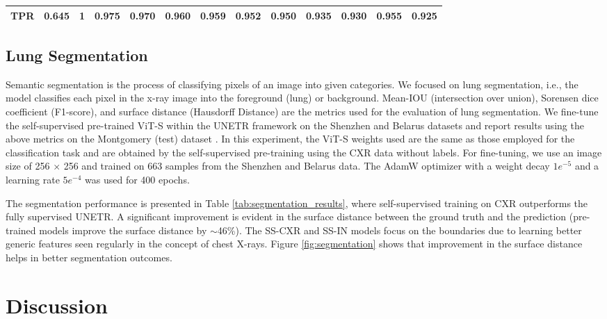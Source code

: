\documentclass[10pt,journal,compsoc]{IEEEtran}
\begin{document}
\begin{table*}[t]
{\begin{tabular}{l|c|ccccccccccc}
\textbf{TPR} & 0.645 & \textbf{1} & 0.975 &0.970 & 0.960 & 0.959 &0.952 & 0.950 & 0.935& 0.930 &0.955 &0.925 \\ \hline
\end{tabular}
}
\end{table*}


\subsection{Lung Segmentation}
\label{sec:lungsegmentation}
Semantic segmentation is the process of classifying pixels of an image into given categories. We focused on lung segmentation, i.e., the model classifies each pixel in the x-ray image into the foreground (lung) or background. Mean-IOU (intersection over union), Sorensen dice coefficient (F1-score), and surface distance (Hausdorff Distance) are the metrics used for the evaluation of lung segmentation. We fine-tune the self-supervised pre-trained ViT-S\cite{dosovitskiy2020image} within the UNETR framework on the Shenzhen \cite{jaeger2013automatic} and Belarus datasets and report results using the above metrics on the Montgomery (test) dataset \cite{candemir2013lung}. In this experiment, the ViT-S weights used are the same as those employed for the classification task and are obtained by the self-supervised pre-training using the CXR data without labels. For fine-tuning, we use an image size of 256 $\times$ 256 and trained on 663 samples from the Shenzhen \cite{jaeger2013automatic} and Belarus data. The AdamW optimizer\cite{adamw} with a weight decay $1e^{-5}$ and a learning rate ${5e^{-4}}$ was used for 400 epochs. 

The segmentation performance is presented in Table \ref{tab:segmentation_results}, where self-supervised training on CXR outperforms the fully supervised UNETR. A significant improvement is evident in the surface distance between the ground truth and the prediction (pre-trained models improve the surface distance by $\sim$46\%). The SS-CXR and SS-IN models focus on the boundaries due to learning better generic features seen regularly in the concept of chest X-rays. Figure \ref{fig:segmentation} shows that improvement in the surface distance helps in better segmentation outcomes.














\section{Discussion}
\end{document}
